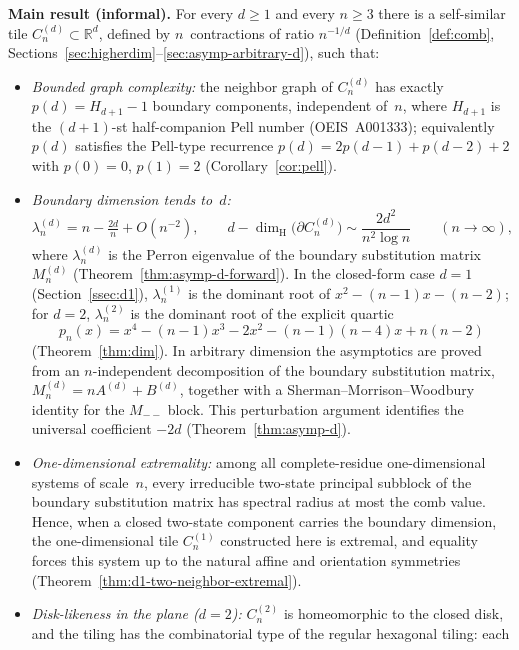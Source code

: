 \documentclass{amsart}
\theoremstyle{definition}
\theoremstyle{remark}
\newcommand{\R}{\mathbb{R}}
\newcommand{\dH}{\dim_{\mathrm{H}}}
\begin{document}
\textbf{Main result (informal).}
For every $d \ge 1$ and every $n \ge 3$ there is a self-similar
tile $C_n^{(d)} \subset \R^d$, defined by $n$~contractions of ratio
$n^{-1/d}$ (Definition~\ref{def:comb},
Sections~\ref{sec:higherdim}--\ref{sec:asymp-arbitrary-d}),
such that:
\begin{itemize}
\item[(a)] \emph{Bounded graph complexity:} the neighbor graph of
  $C_n^{(d)}$ has exactly $p(d) = H_{d+1} - 1$ boundary
  components, independent of~$n$, where $H_{d+1}$ is the
  $(d{+}1)$-st half-companion Pell number (OEIS~A001333);
  equivalently $p(d)$ satisfies the Pell-type recurrence
  $p(d) = 2p(d{-}1) + p(d{-}2) + 2$ with $p(0)=0$, $p(1)=2$
  (Corollary~\ref{cor:pell}).
\item[(b)] \emph{Boundary dimension tends to~$d$:}
  \[
    \lambda_n^{(d)} = n - \tfrac{2d}{n} + O(n^{-2}),
    \qquad
    d - \dH\!\bigl(\partial C_n^{(d)}\bigr)
      \sim \frac{2 d^2}{n^2 \log n}
    \qquad (n \to \infty),
  \]
  where $\lambda_n^{(d)}$ is the Perron eigenvalue of the boundary
  substitution matrix $M_n^{(d)}$
  (Theorem~\ref{thm:asymp-d-forward}).  In the closed-form case $d = 1$
  (Section~\ref{ssec:d1}), $\lambda_n^{(1)}$ is the dominant root
  of $x^2 - (n{-}1)x - (n{-}2)$; for $d = 2$,
  $\lambda_n^{(2)}$ is the dominant root of the explicit quartic
  \[
    p_n(x) = x^4 - (n{-}1)x^3 - 2x^2 - (n{-}1)(n{-}4)x + n(n{-}2)
  \]
  (Theorem~\ref{thm:dim}).  In arbitrary dimension the
  asymptotics are proved from an $n$-independent decomposition
  of the boundary substitution matrix,
  $M_n^{(d)} = n A^{(d)} + B^{(d)}$, together with a
  Sherman--Morrison--Woodbury identity for the $M_{--}$ block.
  This perturbation argument identifies the universal coefficient
  $-2d$ (Theorem~\ref{thm:asymp-d}).
\item[(c)] \emph{One-dimensional extremality:} among all
  complete-residue one-dimensional systems of scale~$n$, every
  irreducible two-state principal subblock of the boundary substitution
  matrix has spectral radius at most the comb value.  Hence, when a
  closed two-state component carries the boundary
  dimension, the one-dimensional tile $C_n^{(1)}$
  constructed here is extremal, and equality forces this system up to
  the natural affine and orientation symmetries
  (Theorem~\ref{thm:d1-two-neighbor-extremal}).
\item[(d)] \emph{Disk-likeness in the plane ($d = 2$):}
  $C_n^{(2)}$ is homeomorphic to the closed disk, and the tiling
  has the combinatorial type of the regular hexagonal tiling: each

\end{itemize}
\end{document}
